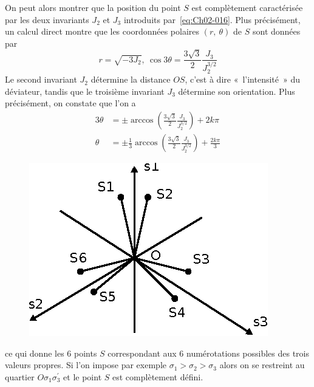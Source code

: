 On peut alors montrer que la position du point $S$ est complètement caractérisée par les deux invariants $J_2$ et $J_3$ introduits par~\eqref{eq:Ch02-016}.
Plus précisément, un calcul direct montre que les coordonnées polaires $\left( r,\ \theta \right)$ de $S$ sont données par 
\begin{equation}
    r = \sqrt{-3J_2},\ \cos 3 \theta = \frac{3\sqrt{3}}{2}\frac{J_3}{J_2^{3/2}}
    \label{eq:Ch02-029}
\end{equation}
Le second invariant $J_2$ détermine la distance $OS$, c'est à dire «~l'intensité~» du déviateur, tandis que le troisième invariant $J_3$ détermine son orientation. 
Plus précisément, on constate que l'on a 
\begin{align}
    3\theta &= \pm \arccos \left( \frac{3\sqrt{3}}{2} \frac{J_3}{J_2^{3/2}} \right) + 2 k \pi\nonumber\\
    \theta &= \pm \frac{1}{3}\arccos \left( \frac{3\sqrt{3}}{2} \frac{J_3}{J_2^{3/2}} \right) + \frac{2 k \pi}{3}
\end{align}
\begin{figure}
    \begin{center}
        \includegraphics{../images/T1_Ch02-0014}
    \end{center}
\end{figure}
ce qui donne les 6 points $S$ correspondant aux 6 numérotations possibles des trois valeurs propres. 
Si l'on impose par exemple $\sigma_1 > \sigma_2 > \sigma_3$ alors on se restreint au quartier $O\sigma_1\sigma_3^{\prime}$ et le point $S$ est complètement défini. 

